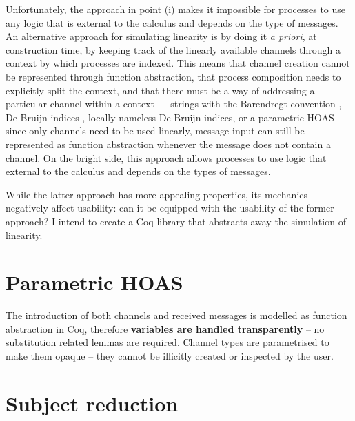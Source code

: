 \documentclass{mproj}
\begin{document}
Unfortunately, the approach in point (i) makes it impossible for processes to use any logic that is external to the calculus and depends on the type of messages. An alternative approach for simulating linearity is by doing it \emph{a priori}, at construction time, by keeping track of the linearly available channels through a context by which processes are indexed.  This means that channel creation cannot be represented through function abstraction, that process composition needs to explicitly split the context, and that there must be a way of addressing a particular channel within a context --- strings with the Barendregt convention \cite{Barendregt1984}, De Bruijn indices \cite{deBruijn1972}, locally nameless De Bruijn indices, or a parametric HOAS \cite{Chlipala2008} --- since only channels need to be used linearly, message input can still be represented as function abstraction whenever the message does not contain a channel. On the bright side, this approach allows processes to use logic that external to the calculus and depends on the types of messages.

While the latter approach has more appealing properties, its mechanics negatively affect usability: can it be equipped with the usability of the former approach? I intend to create a Coq library that abstracts away the simulation of linearity.

\section{Parametric HOAS}\label{phoas}

\cite{Wadler1989}
\cite{Chlipala2008}

The introduction of both channels and received messages is modelled as function abstraction in Coq, therefore \textbf{variables are handled transparently} -- no substitution related lemmas are required. Channel types are parametrised to make them opaque -- they cannot be illicitly created or inspected by the user.

\section{Subject reduction}\label{subject-reduction}
\end{document}
